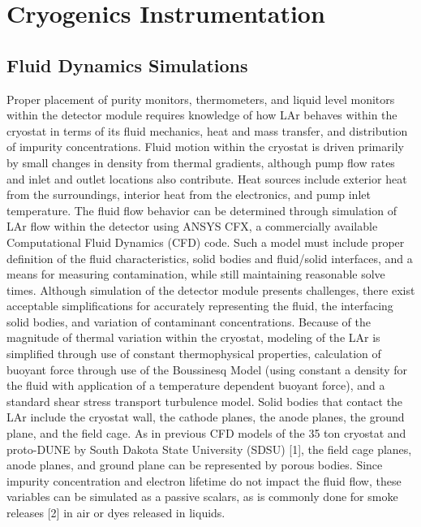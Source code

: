 \section{Cryogenics Instrumentation}
\label{sec:fdsp-cryo-instr}


\subsection{Fluid Dynamics Simulations}
\label{sec:fdsp-slow-cryo-cfd}
Proper placement of purity monitors, thermometers, and liquid level monitors within the detector module requires knowledge of how LAr behaves within the cryostat in terms of its fluid mechanics, heat and mass transfer, and distribution of impurity concentrations. 
Fluid motion within the cryostat is driven primarily by small changes in density from thermal gradients, although pump flow rates and inlet and outlet locations also contribute. 
Heat sources include exterior heat from the surroundings, interior heat from the electronics, and pump inlet temperature. 
The fluid flow behavior can be determined through simulation of LAr flow within the detector using ANSYS CFX, a commercially available Computational Fluid Dynamics (CFD) code. Such a model must include proper definition of the fluid characteristics, solid bodies and fluid/solid interfaces, and a means for measuring contamination, while still maintaining reasonable solve times.
Although simulation of the detector module presents challenges, there exist acceptable simplifications for accurately representing the fluid, the interfacing solid bodies, and variation of contaminant concentrations. Because of the magnitude of thermal variation within the cryostat, modeling of the LAr is simplified through use of constant thermophysical properties, calculation of buoyant force through use of the Boussinesq Model (using constant a density for the fluid with application of a temperature dependent buoyant force), and a standard shear stress transport turbulence model. Solid bodies that contact the LAr include the cryostat wall, the cathode planes, the anode planes, the ground plane, and the field cage. As in previous CFD models of the 35 ton cryostat and proto-DUNE by South Dakota State University (SDSU) [1], the field cage planes, anode planes, and ground plane can be represented by porous bodies. Since impurity concentration and electron lifetime do not impact the fluid flow, these variables can be simulated as a passive scalars, as is commonly done for smoke releases [2] in air or dyes released in liquids.
